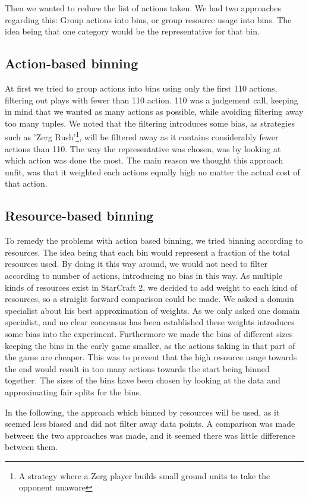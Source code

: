 \documentclass[a4paper,11pt]{article}
\begin{document}
Then we wanted to reduce the list of actions taken. We had two approaches regarding this: Group actions into bins, or group resource usage into bins. The idea being that one category would be the representative for that bin.

\subsection{Action-based binning}
At first we tried to group actions into bins using only the first 110 actions, filtering out plays with fewer than 110 action. 110 was a judgement call, keeping in mind that we wanted as many actions as possible, while avoiding filtering away too many tuples.
We noted that the filtering introduces some bias, as strategies such as 'Zerg Rush'\footnote{A strategy where a Zerg player builds small ground units to take the opponent unaware}, will be filtered away as it contains considerably fewer actions than 110.
The way the representative was chosen, was by looking at which action was done the most. The main reason we thought this approach unfit, was that it weighted each actions equally high no matter the actual cost of that action. 

\subsection{Resource-based binning}
To remedy the problems with action based binning, we tried binning according to resources. The idea being that each bin would represent a fraction of the total resources used.
By doing it this way around, we would not need to filter according to number of actions, introducing no bias in this way.
As multiple kinds of resources exist in StarCraft 2, we decided to add weight to each kind of resources, so a straight forward comparison could be made. We asked a domain specialist about his best approximation of weights.
As we only asked one domain specialist, and no clear concensus has been established these weights introduces some bias into the experiment.
Furthermore we made the bins of different sizes keeping the bins in the early game smaller, as the actions taking in that part of the game are cheaper. This was to prevent that the high resource usage towards the end would result in too many actions towards the start being binned together. The sizes of the bins have been chosen by looking at the data and approximating fair splits for the bins.

In the following, the approach which binned by resources will be used, as it seemed less biased and did not filter away data points.
A comparison was made between the two approaches was made, and it seemed there was little difference between them.
\end{document}

